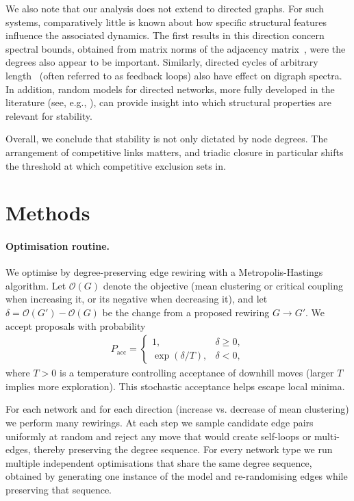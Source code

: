 \documentclass[a4paper,12pt]{article}
\begin{document}
We also note that our analysis does not extend to directed graphs. For such systems, comparatively little is known about how specific structural features influence the associated dynamics. 
The first results in this direction concern spectral bounds, obtained from matrix norms of the adjacency matrix~\cite{LinLuTian2013}, were the degrees also appear to be important. 
Similarly,  directed cycles of arbitrary length~\cite{BrualdiLiu1995} (often referred to as feedback loops) also have effect on digraph spectra.
In addition, random models for directed networks, more fully developed in the literature (see, e.g., \cite{MetzNeriRogers2019}), can provide insight into which structural properties are relevant for stability.

Overall, we conclude that stability is not only dictated by node degrees. 
The arrangement of competitive links matters, and triadic closure in particular shifts the threshold at which competitive exclusion sets in.

\section{Methods}
\paragraph{Optimisation routine.}
We optimise by degree-preserving edge rewiring with a Metropolis-Hastings algorithm. Let $\mathcal{O}(G)$ denote the objective (mean clustering or critical coupling when increasing it, or its negative when decreasing it), and let $\delta=\mathcal{O}(G')-\mathcal{O}(G)$ be the change from a proposed rewiring $G \to G'$. We accept proposals with probability
\begin{align}
    P_{\mathrm{acc}}=
    \begin{cases}
    1, & \delta \ge 0,\\[4pt]
    \exp(\delta/T), & \delta < 0,
    \end{cases}
\end{align}
where $T>0$ is a temperature controlling acceptance of downhill moves (larger $T$ implies more exploration). This stochastic acceptance helps escape local minima.

For each network and for each direction (increase vs. decrease of mean clustering) we perform many rewirings.
At each step we sample candidate edge pairs uniformly at random and reject any move that would create self-loops or multi-edges, thereby preserving the degree sequence. For every network type we run multiple independent optimisations that share the same degree sequence, obtained by generating one instance of the model and re-randomising edges while preserving that sequence.
\\ \\
\end{document}
